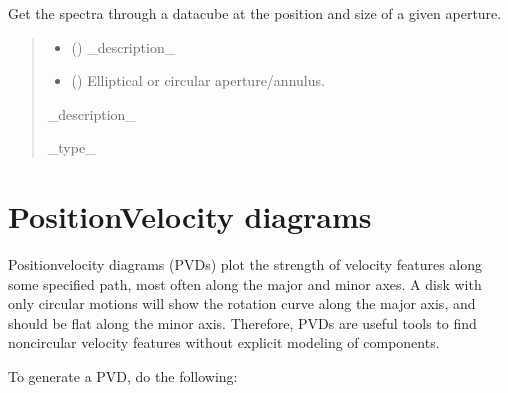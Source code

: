 \documentclass[letterpaper,10pt,english]{sphinxmanual}
\begin{document}
\begin{fulllineitems}
\label{\detokenize{spectra:cubespa.spectra.get_spectra}}
\pysigstartsignatures
{}
\pysigstopsignatures
\sphinxAtStartPar
Get the spectra through a datacube at the position and size of a given aperture.
\begin{quote}\begin{description}
\begin{itemize}
\item {} 
\sphinxAtStartPar
{} () \textendash{} \_description\_

\item {} 
\sphinxAtStartPar
{} () \textendash{} Elliptical or circular aperture/annulus.

\end{itemize}

\sphinxAtStartPar
\_description\_

\sphinxAtStartPar
\_type\_

\end{description}\end{quote}

\end{fulllineitems}


\sphinxstepscope


\section{Position\sphinxhyphen{}Velocity diagrams}
\label{\detokenize{pvds:position-velocity-diagrams}}\label{\detokenize{pvds::doc}}
\sphinxAtStartPar
Position\sphinxhyphen{}velocity diagrams (PVDs) plot the strength of velocity features along some specified path, most often
along the major and minor axes. A disk with only circular motions will show the rotation curve along the
major axis, and should be flat along the minor axis. Therefore, PVDs are useful tools to find non\sphinxhyphen{}circular
velocity features without explicit modeling of components.

\sphinxAtStartPar
To generate a PVD, do the following:
\end{document}
